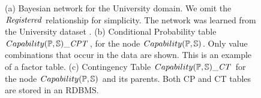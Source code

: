 \documentclass{IEEEtran}
\begin{document}
\begin{figure}[htbp] %
 \centering
{} 
\caption{(a) Bayesian network for the University domain. We omit the $\it{Registered}$ relationship for simplicity. The network was learned from the University dataset \cite{bib:bbsite}.
(b) Conditional Probability table $Capability(\P,\S)\_\cptable$, for the node $Capability(\P,\S)$. Only value combinations that occur in the data are shown. This is an example of a factor table. (c) Contingency Table $Capability(\P,\S)\_\cttable$ for the node $Capability(\P,\S)$ and its parents. Both CP and CT tables are stored in an RDBMS.}
 \label{fig:pbn}
\label{fig:ct-cp-table}
\end{figure}
\end{document}
